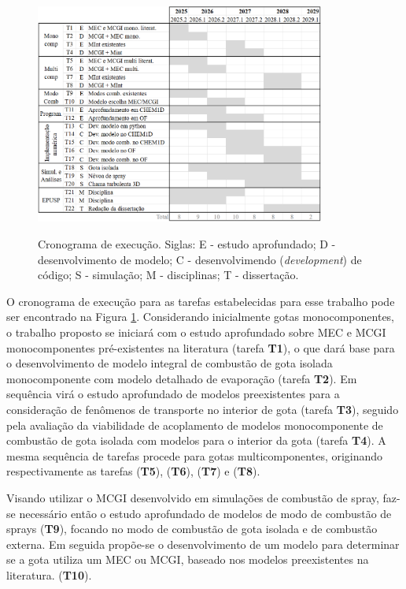 \begin{figure}[ht]
    \centering
    \caption{Cronograma de execução. Siglas: E - estudo aprofundado; D - desenvolvimento de modelo; C - desenvolvimendo (\emph{development}) de código; S - simulação; M - disciplinas; T - dissertação.}
    \includegraphics[width=0.85\textwidth]{30_images/cronograma-3.png}
    \label{fig:cronograma}
\end{figure}


O cronograma de execução para as tarefas estabelecidas para esse trabalho pode ser encontrado na Figura \ref{fig:cronograma}.
Considerando inicialmente gotas monocomponentes, o trabalho proposto se iniciará com o estudo aprofundado sobre MEC e MCGI monocomponentes pré-existentes na literatura (tarefa \textbf{T1}), o que dará base para o desenvolvimento de modelo integral de combustão de gota isolada monocomponente com modelo detalhado de evaporação (tarefa \textbf{T2}).
Em sequência virá o estudo aprofundado de modelos preexistentes para a consideração de fenômenos de transporte no interior de gota (tarefa \textbf{T3}), seguido pela avaliação da viabilidade de acoplamento de modelos monocomponente de combustão de gota isolada com modelos para o interior da gota (tarefa \textbf{T4}).
A mesma sequência de tarefas procede para gotas multicomponentes, originando respectivamente as tarefas (\textbf{T5}), (\textbf{T6}), (\textbf{T7}) e (\textbf{T8}). 

Visando utilizar o MCGI desenvolvido em simulações de combustão de spray, faz-se necessário então o estudo aprofundado de modelos de modo de combustão de sprays (\textbf{T9}), focando no modo de combustão de gota isolada e de combustão externa. Em seguida propõe-se o desenvolvimento de um modelo para determinar se a gota utiliza um MEC ou MCGI, baseado nos modelos preexistentes na literatura. (\textbf{T10}).

